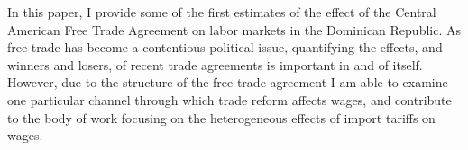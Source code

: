 In this paper, I provide some of the first estimates of the effect of the Central American
Free Trade Agreement on labor markets in the Dominican Republic. As free trade has become 
a contentious political issue, quantifying the effects, and winners and losers, of recent trade 
agreements is important in and of itself. However, due to the structure of the free trade
agreement I am able to examine one particular channel through which trade reform affects wages,
and contribute to the body of work focusing on the heterogeneous
effects of import tariffs on wages. 